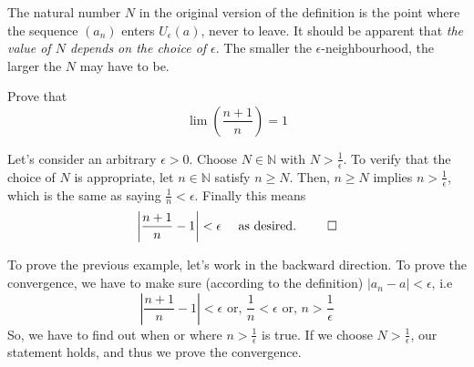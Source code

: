 \documentclass[12pt]{article}
\begin{document}
The natural number $N$ in the original version of the definition is the point where the sequence $(a_n)$ enters $U_\epsilon(a)$, never to leave. It should be apparent that \textit{the value of $N$ depends on the choice of $\epsilon$}. The smaller the $\epsilon$-neighbourhood, the larger the $N$ may have to be.

\begin{example}{Prove that \[ \lim \left( \frac{n+1}{n} \right) =1 \]}
    
Let's consider an arbitrary $\epsilon>0$. Choose $N\in \mathbb{N}$ with $N>\frac{1}{\epsilon}$. To verify that the choice of $N$ is appropriate, let $n\in\mathbb{N}$ satisfy $n \ge N$. Then, $n \ge N$ implies $n>\frac{1}{\epsilon}$, which is the same as saying $\frac{1}{n}<\epsilon$. Finally this means \[
    \left| \frac{n+1}{n} - 1 \right| < \epsilon \text{ \quad as desired. } \qed
\] 
\end{example}

\begin{note}
    
    To prove the previous example, let's work in the backward direction. To prove the convergence, we have to make sure (according to the definition) $|a_n-a|<\epsilon$, i.e \[
        \left| \frac{n+1}{n}-1 \right| < \epsilon \text{ or, } \frac{1}{n}<\epsilon \text{ or, } n>\frac{1}{\epsilon}
    \] So, we have to find out when or where $n>\frac{1}{\epsilon}$ is true. If we choose $N > \frac{1}{\epsilon}$, our statement holds, and thus we prove the convergence.
\end{note}
\end{document}
